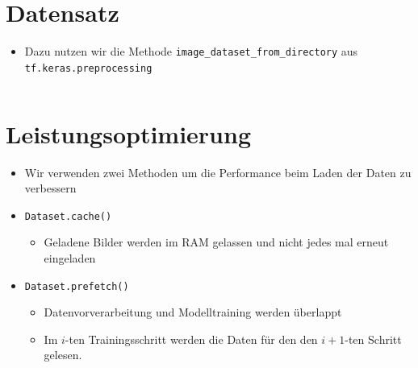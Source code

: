 \documentclass[t]{beamer}
\newcommand\pycode[1]{\inputminted[frame=lines, framesep=2mm, fontsize=\normalsize]{python}{#1}}
\begin{document}
\section{Datensatz}
\begin{frame}
    \begin{itemize}
        \item Dazu nutzen wir die Methode \texttt{image\_dataset\_from\_directory} aus \texttt{tf.keras.preprocessing}
        \pycode{./code-snippets/dataset-from-directory.py}
    \end{itemize}
\end{frame}

\section{Leistungsoptimierung}
\begin{frame}
    \begin{itemize}
        \item Wir verwenden zwei Methoden um die Performance beim Laden der Daten zu verbessern
        \item \texttt{Dataset.cache()}
        \begin{itemize}
            \item Geladene Bilder werden im RAM gelassen und nicht jedes mal erneut eingeladen
        \end{itemize}
        \item \texttt{Dataset.prefetch()}
        \begin{itemize}
            \item Datenvorverarbeitung und Modelltraining werden überlappt
            \item Im \(i\)-ten Trainingsschritt werden die Daten für den den \(i+1\)-ten Schritt gelesen.
        \end{itemize}
    \end{itemize}
\end{frame}
\end{document}
